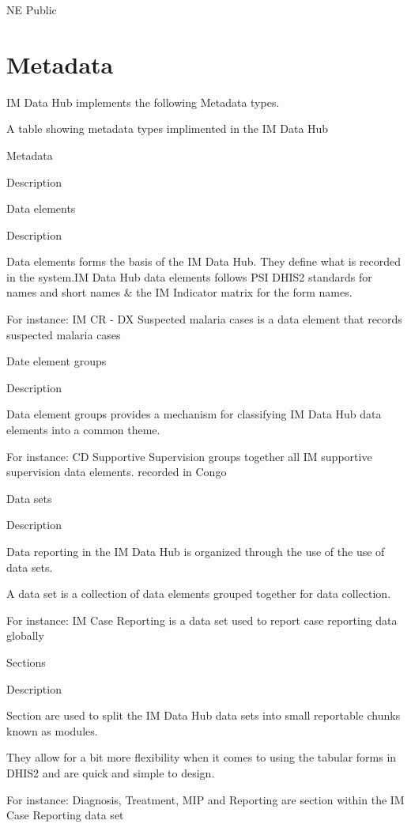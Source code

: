 \documentclass[]{book}
\begin{document}
NE Public

\hypertarget{metadata}{%
\section{Metadata}\label{metadata}}

IM Data Hub implements the following Metadata types.

\label{tab:unnamed-chunk-14}A table showing metadata types implimented in the IM Data Hub

Metadata

Description

Data elements

Description

Data elements forms the basis of the IM Data Hub. They define what is recorded in the system.IM Data Hub data elements follows PSI DHIS2 standards for names and short names \& the IM Indicator matrix for the form names.

For instance: IM CR - DX Suspected malaria cases is a data element that records suspected malaria cases

Date element groups

Description

Data element groups provides a mechanism for classifying IM Data Hub data elements into a common theme.

For instance: CD Supportive Supervision groups together all IM supportive supervision data elements. recorded in Congo

Data sets

Description

Data reporting in the IM Data Hub is organized through the use of the use of data sets.

A data set is a collection of data elements grouped together for data collection.

For instance: IM Case Reporting is a data set used to report case reporting data globally

Sections

Description

Section are used to split the IM Data Hub data sets into small reportable chunks known as modules.

They allow for a bit more flexibility when it comes to using the tabular forms in DHIS2 and are quick and simple to design.

For instance: Diagnosis, Treatment, MIP and Reporting are section within the IM Case Reporting data set
\end{document}
